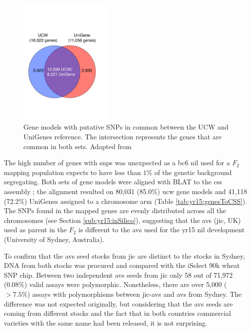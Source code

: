 \begin{figure}
    \includegraphics[width=0.4\textwidth]{Yr15/Figures/geneCounts.pdf} 
    \caption[Gene models with putative SNPs]{Gene models with putative SNPs in common between the UCW and UniGenes reference. The intersection represents the genes that are common in both sets. Adapted from \citet{Ramirez-Gonzalez2015b}}
    \label{fig:yr15:geneCount}
\end{figure}



The high number of genes with \gls{snp}s was unexpected as a \gls{bc}6 \gls{nil} used for a $F_2$ mapping population expects to have less than $1\%$ of the genetic background segregating. 
Both sets of gene models were aligned with BLAT \citep{Kent2002} to the \gls{css} assembly \citep{Mayer2014}; the alignment resulted on 80,031 (85.0\%) \acrshort{ucw} gene models and 41,118 (72.2\%) UniGenes assigned to a chromosome arm (Table \ref{tab:yr15:genesToCSS}). 
The SNPs found in the mapped genes are evenly distributed across all the chromosomes (see Section \ref{sub:yr15:inSilico}), suggesting that the \gls{avs} (\gls{jic}, UK) used as parent in the $F_{2}$ is different to the \gls{avs} used for the \acrshort{yr15} \acrshort{nil} development (University of Sydney, Australia).  

To confirm that the \gls{avs} seed stocks from \gls{jic} are distinct to the stocks in Sydney, DNA from both stocks was procured and compared with the iSelect 90k wheat SNP chip. 
Between two independent \gls{avs} seeds from \gls{jic} only 58 out of 71,972 (0.08\%) valid assays were polymorphic. 
Nonetheless, there are over 5,000 ($>7.5\%$) assays with polymorphisms between  \gls{jic}-\gls{avs} and \gls{avs} from Sydney. 
The difference was not expected originally, but considering that the \gls{avs} seeds are coming from different stocks and the fact that in both countries commercial varieties with the same name had been released, it is not surprising. 


